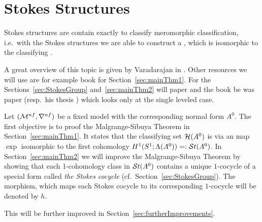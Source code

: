 \chapter{Stokes Structures}\label{chap:stokes}
Stokes structures are contain exactly  to
classify meromorphic classification, i.e.\ with the Stokes structures we are
able to construct a , which is isomorphic to the classifying
.

A great overview of this topic is given by Varadarajan in
\cite{Varadarajan96linearmeromorphic}. Other resources we will use are for
example  book \cite[section II]{sabbah2007isomonodromic} for
Section~\ref{sec:mainThm1}.
For the Sections~\ref{sec:StokesGroup} and~\ref{sec:mainThm2} will
 paper \cite{Loday1994} and the book
\cite[Sec.4]{Loday2014} be  was 
paper \cite{boalch} (resp.\ his thesis \cite{thboalch}) which looks only at the
single leveled case.

Let $(\mathcal{M}^{nf},\nabla^{nf})$ be a fixed model with the corresponding normal
form $A^0$.  The first objective is to proof the Malgrange-Sibuya Theorem
in Section~\ref{sec:mainThm1}. It states that the classifying set $\mathcal{H}(A^0)$
is via an map $\exp$ isomorphic to the first cohomology
$H^1(S^1;\Lambda(A^0))=:\mathcal{S}{}t(A^0)$.
In Section~\ref{sec:mainThm2} we will improve the Malgrange-Sibuya Theorem by
showing that each 1-cohomology class in $\mathcal{S}{}t(A^0)$ contains a unique
$1$-cocycle of a special form called \emph{the Stokes cocycle}
(cf.\ Section~\ref{sec:StokesGroup}).
The morphism, which maps each Stokes cocycle to its corresponding $1$-cocycle
will be denoted by $h$.

This will be further improved in Section~\ref{sec:furtherImprovements}.

